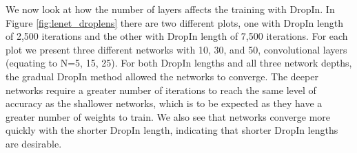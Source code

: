 \documentclass[10pt,twocolumn,letterpaper]{article}
\newcommand{\dropin}{DropIn }
\newcommand{\dropinNS}{DropIn}
\begin{document}
We now look at how the number of layers affects the training with \dropinNS.  
In Figure \ref{fig:lenet_droplens} there are two different plots, one with \dropin length of 2,500 iterations and the other with \dropin length of 7,500 iterations.  For each plot we present three different networks with 10, 30, and 50, convolutional layers (equating to N=5, 15, 25).  
For both \dropin lengths and all three network depths, the gradual \dropin method allowed the networks to converge.  
The deeper networks require a greater number of iterations to reach the same level of accuracy as the shallower networks, which is to be expected as they have a greater number of weights to train.  We also see that networks converge  more quickly with the shorter \dropin length,  indicating that shorter \dropin lengths are desirable.  
\end{document}
